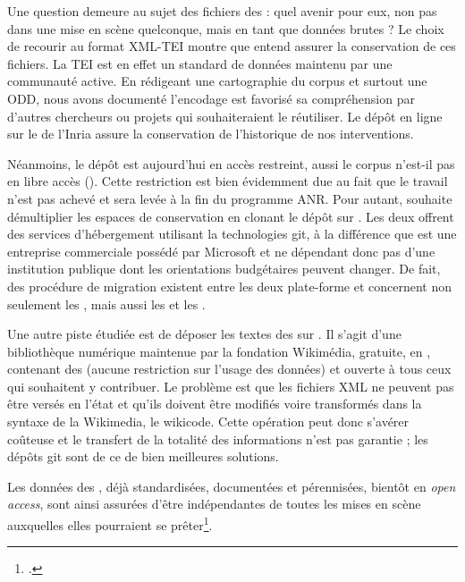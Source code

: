 Une question demeure au sujet des fichiers des \odm{} : quel avenir pour eux, non pas dans une mise en scène quelconque, mais en tant que données brutes ? Le choix de recourir au format XML-TEI montre que \timeus{} entend assurer la conservation de ces fichiers. La TEI est en effet un standard de données maintenu par une communauté active. En rédigeant une cartographie du corpus et surtout une ODD, nous avons documenté l'encodage est favorisé sa compréhension par d'autres chercheurs ou projets qui souhaiteraient le réutiliser. Le dépôt en ligne sur le \gitlab{} de l'Inria assure la conservation de l'historique de nos interventions.

Néanmoins, le dépôt \gitlab{} est aujourd'hui en accès restreint, aussi le corpus n'est-il pas en libre accès (\openaccess). Cette restriction est bien évidemment due au fait que le travail n'est pas achevé et sera levée à la fin du programme ANR. Pour autant, \timeus{} souhaite démultiplier les espaces de conservation en clonant le dépôt \gitlab{} sur \github. Les deux offrent des services d'hébergement utilisant la technologies git, à la différence que \github{} est une entreprise commerciale possédé par Microsoft et ne dépendant donc pas d'une institution publique dont les orientations budgétaires peuvent changer. De fait, des procédure de migration existent entre les deux plate-forme et concernent non seulement les \commits{}, mais aussi les \issues{} et les \mergerequests.

Une autre piste étudiée est de déposer les textes des \odm{} sur \wikisource. Il s'agit d'une bibliothèque numérique maintenue par la fondation Wikimédia, gratuite, en \openaccess, contenant des \opendata{} (aucune restriction sur l'usage des données) et ouverte à tous ceux qui souhaitent y contribuer. Le problème est que les fichiers XML ne peuvent pas être versés en l'état et qu'ils doivent être modifiés voire transformés dans la syntaxe de la Wikimedia, le wikicode. Cette opération peut donc s'avérer coûteuse et le transfert de la totalité des informations n'est pas garantie ; les dépôts git sont de ce \pov{} de bien meilleures solutions.

Les données des \odm, déjà standardisées, documentées et pérennisées, bientôt en \textit{open access}, sont ainsi assurées d'être indépendantes de toutes les mises en scène auxquelles elles pourraient se prêter\footcite[p. 63]{jolivet}.

